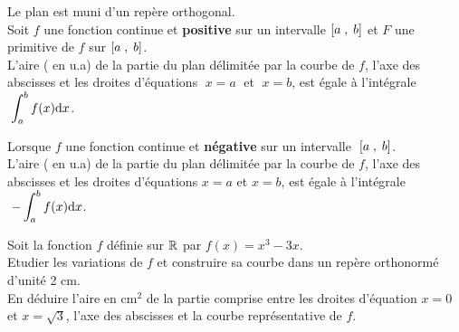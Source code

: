  
 \begin{definition}
 

 Le  plan est  muni d'un repère orthogonal.\\ Soit $f$ une fonction continue et\textbf{ positive} sur un intervalle $ \left[a\;,\; b\right] $  et  $F$ une primitive de $f$ sur $ \left[a\;,\; b\right] $.\\

  L'aire ( en u.a) de la partie du plan délimitée par la courbe de $f$, l'axe des abscisses et les droites d'équations $\; x=a\;$ et $ \;x=b$, est égale à l'intégrale  $\; \displaystyle\int_{a}^{b}f(x){\rm d}x $.
\end{definition}
\begin{center}
\end{center}

\begin{remark}

Lorsque $ f $ une fonction continue et\textbf{ négative} sur un intervalle $\; \left[a\;,\; b\right] $.\\
 L'aire ( en u.a) de la partie du plan délimitée par la courbe de $f$, l'axe des abscisses et les droites d'équations $ x=a$ et $ x=b$, est égale à l'intégrale  $ \;-\displaystyle\int_{a}^{b}f(x){\rm d}x $.
\end{remark}

\medskip

\begin{exercice}

Soit  la fonction $ f $  définie sur  $ \mathbb{R} $  par $ f(x)=x^{3}-3x $.\\
Etudier les variations de $ f $ et construire sa courbe dans un repère  orthonormé d'unité 2 cm.\\
En déduire l'aire en cm$ ^{2} $ de la partie comprise entre les
droites d'équation $x = 0$ et $x = \sqrt{3}$, l'axe des abscisses
et la courbe représentative de $ f$.
\end{exercice}

